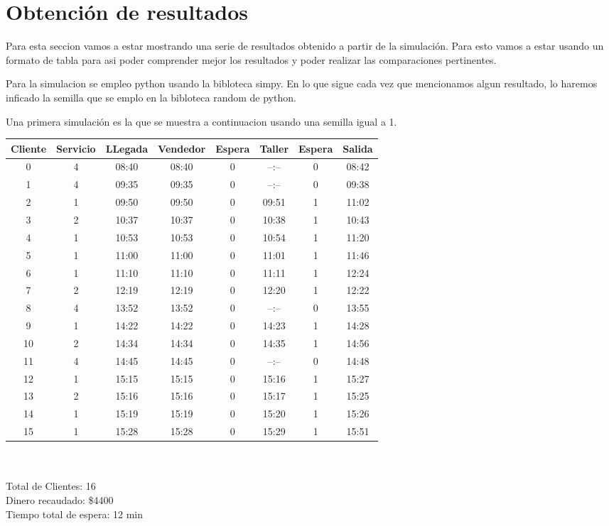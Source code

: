\documentclass[12pt]{article}
\begin{document}
\section*{Obtenci\'on de resultados}

Para esta seccion vamos a estar mostrando una serie de resultados obtenido a partir de la simulaci\'on. Para esto vamos a estar usando un formato de tabla para asi poder comprender mejor los resultados y poder realizar las comparaciones pertinentes.

Para la simulacion se empleo python usando la bibloteca simpy. En lo que sigue cada vez que mencionamos algun resultado, lo haremos inficado la semilla que se emplo en la bibloteca random de python.

Una primera simulaci\'on es la que se muestra a continuacion usando una semilla igual a 1.\\

\begin{tabular}{|c|c|c|c|c|c|c|c|}
\hline
Cliente & Servicio & LLegada & Vendedor & Espera & Taller & Espera & Salida \\
\hline
0&4 & 08:40 & 08:40 & 0 & --:-- & 0 & 08:42\\
1&4 & 09:35 & 09:35 & 0 & --:-- & 0 & 09:38\\
2&1 & 09:50 & 09:50 & 0 & 09:51 & 1 & 11:02\\
3&2 & 10:37 & 10:37 & 0 & 10:38 & 1 & 10:43\\
4&1 & 10:53 & 10:53 & 0 & 10:54 & 1 & 11:20\\
5&1 & 11:00 & 11:00 & 0 & 11:01 & 1 & 11:46\\
6&1 & 11:10 & 11:10 & 0 & 11:11 & 1 & 12:24\\
7&2 & 12:19 & 12:19 & 0 & 12:20 & 1 & 12:22\\
8&4 & 13:52 & 13:52 & 0 & --:-- & 0 & 13:55\\
9&1 & 14:22 & 14:22 & 0 & 14:23 & 1 & 14:28\\
10&2 & 14:34 & 14:34 & 0 & 14:35 & 1 & 14:56\\
11&4 & 14:45 & 14:45 & 0 & --:-- & 0 & 14:48\\
12&1 & 15:15 & 15:15 & 0 & 15:16 & 1 & 15:27\\
13&2 & 15:16 & 15:16 & 0 & 15:17 & 1 & 15:25\\
14&1 & 15:19 & 15:19 & 0 & 15:20 & 1 & 15:26\\
15&1 & 15:28 & 15:28 & 0 & 15:29 & 1 & 15:51\\
\hline
\end{tabular}\\
\\
\noindent Total de Clientes: 16\\
Dinero recaudado: \$4400\\
Tiempo total de espera: 12 min\\
\end{document}
